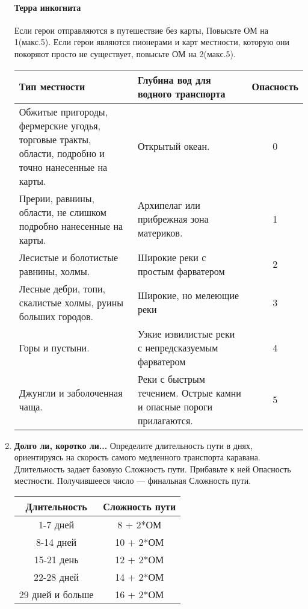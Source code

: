 \begin{enumerate}
\begin{tcolorbox}
\paragraph{Терра инкогнита} Если герои отправляются в путешествие без карты, Повысьте ОМ на 1(макс.5). Если герои являются пионерами и карт местности, которую они покоряют просто не существует, повысьте ОМ на 2(макс.5).
\end{tcolorbox}
\begin{center}
\begin{tabular}{|p{7cm}|p{7cm}|c|}
\hline
Тип местности & Глубина вод для водного транспорта & Опасность \\ \hline
Обжитые пригороды, фермерские угодья, торговые тракты, области, подробно и точно нанесенные на карты. & Открытый океан. & 0 \\ \hline
Прерии, равнины, области, не слишком подробно нанесенные на карты. & Архипелаг или прибрежная зона материков. & 1 \\ \hline
Лесистые и болотистые равнины, холмы. & Широкие реки с простым фарватером & 2 \\ \hline
Лесные дебри, топи, скалистые холмы, руины больших городов. & Широкие, но мелеющие реки & 3 \\ \hline
Горы и пустыни. & Узкие извилистые реки с непредсказуемым фарватером & 4 \\ \hline
Джунгли и заболоченная чаща. & Реки с быстрым течением. Острые камни и опасные пороги прилагаются. & 5 \\ \hline
\end{tabular}
\end{center}
\item \textbf{Долго ли, коротко ли...} Определите длительность пути в днях, ориентируясь на скорость самого медленного транспорта каравана. Длительность задает базовую Сложность пути. Прибавьте к ней Опасность местности. Получившееся число — финальная Сложность пути.
\begin{center}
\begin{tabular}{|c|c|}
\hline
Длительность & Сложность пути \\ \hline
1-7 дней & 8 + 2*ОМ \\ \hline
8-14 дней & 10 + 2*ОМ \\ \hline
15-21 день & 12 + 2*ОМ \\ \hline
22-28 дней & 14 + 2*ОМ \\ \hline
29 дней и больше & 16 + 2*ОМ \\ \hline
\end{tabular}

\end{center}
\end{enumerate}
